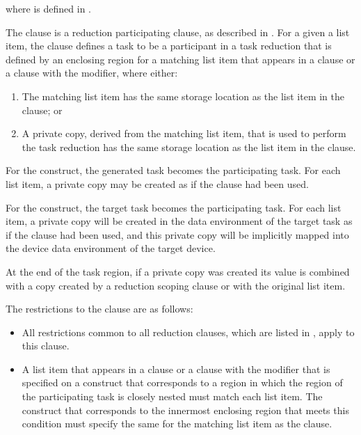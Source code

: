 where  is defined in 
.

\descr
The  clause is a reduction participating clause, as
described in . For a
given a list item, the  clause defines a task to be a
participant in a task reduction that is defined by an enclosing region for a
matching list item that appears in a  clause or a
 clause with the  modifier, where either:

\begin{enumerate}
\item The matching list item has the same storage location as the list
      item in the  clause; or
\item A private copy, derived from the matching list item, that is used to
      perform the task reduction has the same storage location as the list item
      in the  clause.
\end{enumerate}

For the  construct, the generated task becomes the participating
task. For each list item, a private copy may be created as if the 
clause had been used.

For the  construct, the target task becomes the participating
task. For each list item, a private copy will be created in the data
environment of the target task as if the  clause had been used,
and this private copy will be implicitly mapped into the device data
environment of the target device.

At the end of the task region, if a private copy was created its value is
combined with a copy created by a reduction scoping clause or with the original
list item.

\restrictions
The restrictions to the  clause are as follows:

\begin{itemize}
\item All restrictions common to all reduction clauses, which are listed in
      , apply to
      this clause.
\item A list item that appears in a  clause or a 
       clause with the  modifier that is specified on 
      a construct that corresponds to a region in which the region of the 
      participating task is closely nested must match each list item. The 
      construct that corresponds to the innermost enclosing region that meets
      this condition must specify the same  for the
      matching list item as the  clause.
\end{itemize}



